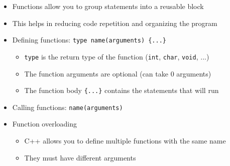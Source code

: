 \documentclass{article}
\begin{document}
\begin{itemize}
	\item Functions allow you to group statements into a reusable block
	\item This helps in reducing code repetition and organizing the program
	\item Defining functions: \texttt{type name(arguments) \{...\}} \begin{itemize}
		\item \texttt{type} is the return type of the function (\texttt{int}, \texttt{char}, \texttt{void}, ...)
		\item The function arguments are optional (can take 0 arguments)
		\item The function body \texttt{\{...\}} contains the statements that will run
	\end{itemize}
	\item Calling functions: \texttt{name(arguments)}
	
	\item Function overloading \begin{itemize}
		\item C++ allows you to define multiple functions with the same name
		\item They must have different arguments
		
	\end{itemize}
\end{itemize}

\
\end{document}
